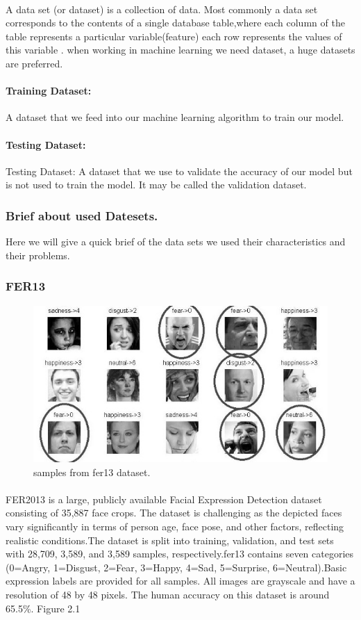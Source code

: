 \paragraph{}
A data set (or dataset) is a collection of data. Most commonly a data set corresponds to the contents of a single database table,where each column of the table represents a particular variable(feature) each row represents the values of this variable . when working in machine learning we need dataset, a huge datasets are preferred.
\paragraph{Training Dataset:}
 A dataset that we feed into our machine learning algorithm to train our model.
\paragraph{Testing Dataset:}
Testing Dataset: A dataset that we use to validate the accuracy of our model but is not used to train the model. It may be called the validation dataset.

\subsubsection{Brief about used Datesets.}
Here we will give a quick brief of the data sets we used their characteristics and their problems.
\subsubsection{FER13}
\begin{figure}
	\centering
	\includegraphics[width=.5\textwidth]{images/fer2013.jpg}
	\caption{samples from fer13 dataset.}
\end{figure} 
\paragraph{}
FER2013 is a large, publicly available Facial Expression Detection dataset consisting of 35,887 face crops. The dataset is challenging as the depicted faces vary significantly in terms of person age, face pose, and other factors, reflecting realistic conditions.The dataset is split into training, validation, and test sets with 28,709, 3,589, and 3,589 samples, respectively.fer13 contains seven categories (0=Angry, 1=Disgust, 2=Fear, 3=Happy, 4=Sad, 5=Surprise, 6=Neutral).Basic expression labels are provided for all samples. All images are grayscale and have a resolution of 48 by 48 pixels. The human accuracy on this dataset is around 65.5\%. Figure 2.1
 
